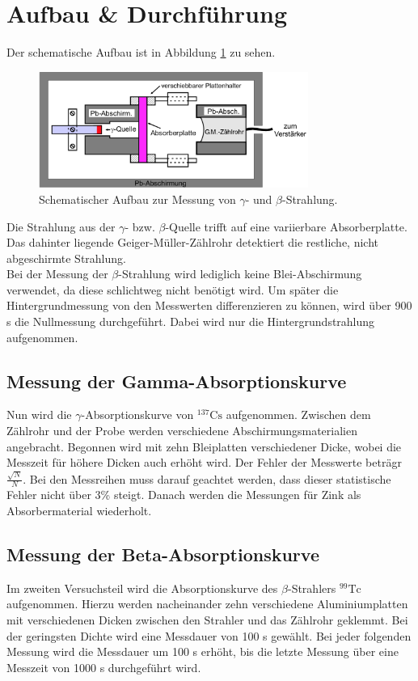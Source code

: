 \section{Aufbau \& Durchführung}
Der schematische Aufbau ist in Abbildung \ref{fig:Aufbau} zu sehen.
\begin{figure}[H]
  \centering
  \includegraphics[height=3.8cm]{Aufbau/Aufbau.pdf}
  \caption{Schematischer Aufbau zur Messung von $\gamma$- und $\beta$-Strahlung.}
  \label{fig:Aufbau}
\end{figure}
Die Strahlung aus der $\gamma$- bzw. $\beta$-Quelle trifft auf eine variierbare Absorberplatte. Das dahinter liegende Geiger-Müller-Zählrohr detektiert die restliche, nicht abgeschirmte Strahlung.
\\
Bei der Messung der $\beta$-Strahlung wird lediglich keine Blei-Abschirmung verwendet, da diese schlichtweg nicht benötigt wird.
Um später die Hintergrundmessung von den Messwerten differenzieren zu können, wird über 900 s die Nullmessung durchgeführt. Dabei wird nur die Hintergrundstrahlung aufgenommen. 

\subsection{Messung der Gamma-Absorptionskurve}
Nun wird die $\gamma$-Absorptionskurve von $^{137}$$\text{Cs}$ aufgenommen. 
Zwischen dem Zählrohr und der Probe werden verschiedene Abschirmungsmaterialien angebracht. Begonnen wird mit zehn Bleiplatten verschiedener Dicke, wobei die Messzeit für höhere Dicken auch erhöht wird. Der Fehler der Messwerte beträgr $\frac{\sqrt{N}}{N}$. Bei den Messreihen muss darauf geachtet werden, dass dieser statistische Fehler nicht über 3\% steigt. Danach werden die Messungen für Zink als Absorbermaterial wiederholt. 

\subsection{Messung der Beta-Absorptionskurve}
Im zweiten Versuchsteil wird die Absorptionskurve des $\beta$-Strahlers $^{99}$$\text{Tc}$ aufgenommen. 
Hierzu werden nacheinander zehn verschiedene Aluminiumplatten mit verschiedenen Dicken zwischen den Strahler und das Zählrohr geklemmt. Bei der geringsten Dichte wird eine Messdauer von 100 s gewählt. Bei jeder folgenden Messung wird die Messdauer um 100 s erhöht, bis die letzte Messung über eine Messzeit von 1000 s durchgeführt wird.